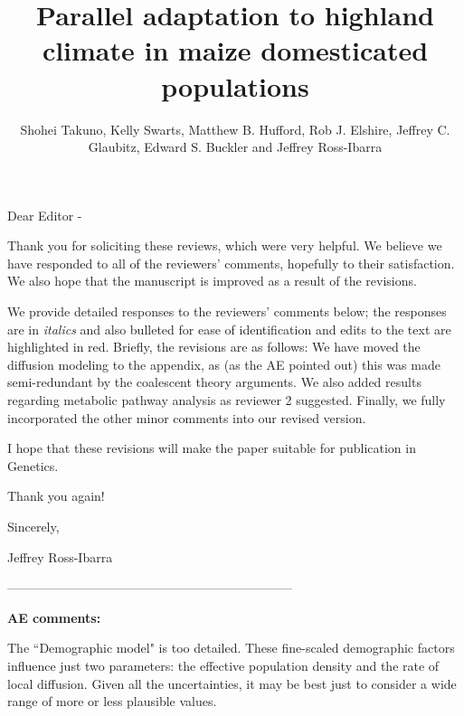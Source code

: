 \documentclass[onecolumn,oneside,letterpaper]{article}
\title{Parallel adaptation to highland climate in maize domesticated populations}
\author{
 Shohei Takuno, Kelly Swarts, Matthew B. Hufford, Rob J. Elshire, Jeffrey C. Glaubitz, Edward S. Buckler and Jeffrey Ross-Ibarra
   }
\begin{document}
\maketitle
Dear Editor - 

Thank you for soliciting these reviews, which were very helpful.   We believe we have responded to all of the reviewers' comments, hopefully to their satisfaction.  We also hope that the manuscript is improved as a result of the revisions.  

We provide detailed responses to the reviewers' comments below; the responses are in \textit{italics} and also bulleted for ease of identification and edits to the text are highlighted in red.
Briefly, the revisions are as follows:  
We have moved the diffusion modeling to the appendix, as (as the AE pointed out)
this was made semi-redundant by the coalescent theory arguments.
We also added results regarding metabolic pathway analysis as reviewer 2 suggested.  
Finally, we fully incorporated the other minor comments into our revised version.  

I hope that these revisions will make the paper suitable for publication in Genetics. 

Thank you again! 

Sincerely, 

Jeffrey Ross-Ibarra

--------------------------------------------------------------------


\textbf{AE comments:}

The ``Demographic model" is too detailed.  These fine-scaled demographic factors influence just two parameters: 
the effective population density and the rate of local diffusion.  
Given all the uncertainties, it may be best just to consider a wide range of more or less plausible values. 

\end{document}
